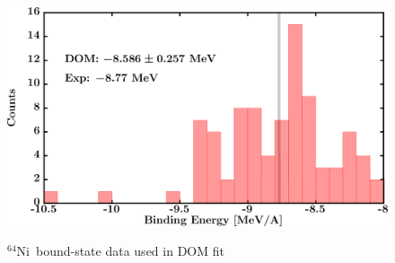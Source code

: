 \documentclass[twocolumn,secnumarabic,amssymb, nobibnotes, aps, prl,
superscriptaddress, nobalancelastpage]{revtex4}
\newcommand{\niFour}{\ensuremath{^{64}}N\lowercase{i}}
\begin{document}
\begin{figure}[!htb]
\begin{minipage}{0.4\linewidth}
        \label{DOM_ni64_RMSRadius}
    \end{minipage}
    \begin{minipage}{0.4\linewidth}
        \centering
        \includegraphics[width=\linewidth]{figures/ni64_BE.png}
        \label{DOM_ni64_BE}
    \end{minipage}
    \caption{\niFour\ bound-state data used in DOM fit}
    \label{DOM_ni64_structural}
\end{figure}
\end{document}
